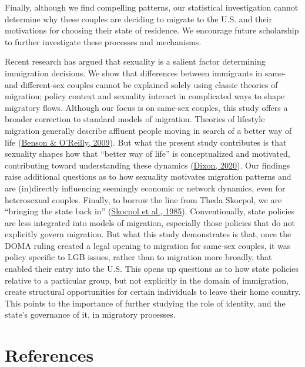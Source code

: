 \documentclass[
  11pt,
]{article}
\begin{document}
Finally, although we find compelling patterns, our statistical investigation cannot determine why these couples are deciding to migrate to the U.S. and their motivations for choosing their state of residence. We encourage future scholarship to further investigate these processes and mechanisms.

Recent research has argued that sexuality is a salient factor determining immigration decisions. We show that differences between immigrants in same- and different-sex couples cannot be explained solely using classic theories of migration; policy context and sexuality interact in complicated ways to shape migratory flows. Although our focus is on same-sex couples, this study offers a broader correction to standard models of migration. Theories of lifestyle migration generally describe affluent people moving in search of a better way of life (\protect\hyperlink{ref-benson_2009}{Benson \& O'Reilly, 2009}). But what the present study contributes is that sexuality shapes how that ``better way of life'' is conceptualized and motivated, contributing toward understanding these dynamics (\protect\hyperlink{ref-dixon_2020}{Dixon, 2020}). Our findings raise additional questions as to how sexuality motivates migration patterns and are (in)directly influencing seemingly economic or network dynamics, even for heterosexual couples. Finally, to borrow the line from Theda Skocpol, we are ``bringing the state back in'' (\protect\hyperlink{ref-skocpol_1985}{Skocpol et al., 1985}). Conventionally, state policies are less integrated into models of migration, especially those policies that do not explicitly govern migration. But what this study demonstrates is that, once the DOMA ruling created a legal opening to migration for same-sex couples, it was policy specific to LGB issues, rather than to migration more broadly, that enabled their entry into the U.S. This opens up questions as to how state policies relative to a particular group, but not explicitly in the domain of immigration, create structural opportunities for certain individuals to leave their home country. This points to the importance of further studying the role of identity, and the state's governance of it, in migratory processes.

\hypertarget{references}{%
\section{References}\label{references}}

\setlength{\parindent}{-0.2in}
\setlength{\leftskip}{0.2in}
\setlength{\parskip}{8pt}
\end{document}
